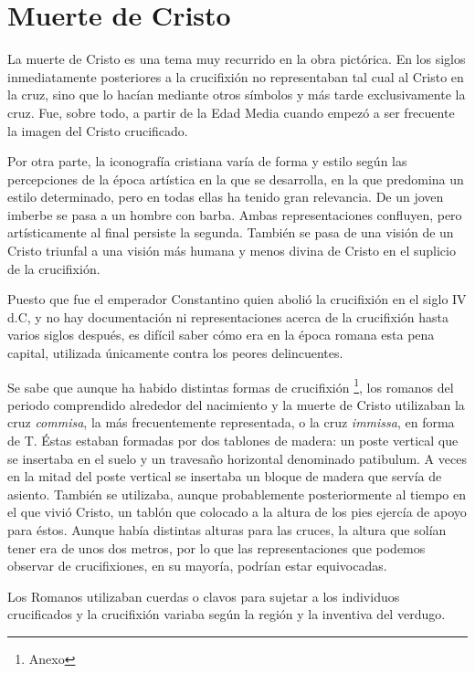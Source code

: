 \section{Muerte de Cristo}
La muerte de Cristo es una tema muy recurrido en la obra pictórica. En los siglos inmediatamente posteriores a la crucifixión no representaban tal cual al Cristo en la cruz, sino que lo hacían mediante otros símbolos y más tarde exclusivamente la cruz. Fue, sobre todo, a partir de la Edad Media cuando empezó a ser frecuente la imagen del Cristo crucificado.

Por otra parte, la iconografía cristiana varía de forma y estilo según las percepciones de la época artística en la que se desarrolla, en la que predomina un estilo determinado, pero en todas ellas ha tenido gran relevancia. De un joven imberbe se pasa a un hombre con barba. Ambas representaciones confluyen, pero artísticamente al final persiste la segunda. También se pasa de una visión de un Cristo triunfal a una visión más humana y menos divina de Cristo en el suplicio de la crucifixión.

Puesto que fue el emperador Constantino quien abolió la crucifixión en el siglo IV d.C, y no hay documentación ni representaciones acerca de la crucifixión hasta varios siglos después, es difícil saber cómo era en la época romana esta pena capital, utilizada únicamente contra los peores delincuentes.

Se sabe que aunque ha habido distintas formas de crucifixión \footnote{Anexo}, los romanos del periodo comprendido alrededor del nacimiento y la muerte de Cristo utilizaban la cruz \textit{commisa}, la más frecuentemente representada, o la cruz \textit{immissa}, en forma de T. Éstas estaban formadas por dos tablones de madera: un poste vertical que se insertaba en el suelo y un travesaño horizontal denominado patibulum. A veces en la mitad del poste vertical se insertaba un bloque de madera que servía de asiento. También se utilizaba, aunque probablemente posteriormente al tiempo en el que vivió Cristo, un tablón que colocado a la altura de los pies ejercía de apoyo para éstos. Aunque había distintas alturas para las cruces, la altura que solían tener era de unos dos metros, por lo que las representaciones que podemos observar de crucifixiones, en su mayoría, podrían estar equivocadas.

Los Romanos utilizaban cuerdas o clavos para sujetar a los individuos crucificados y la crucifixión variaba según la región y la inventiva del verdugo.

